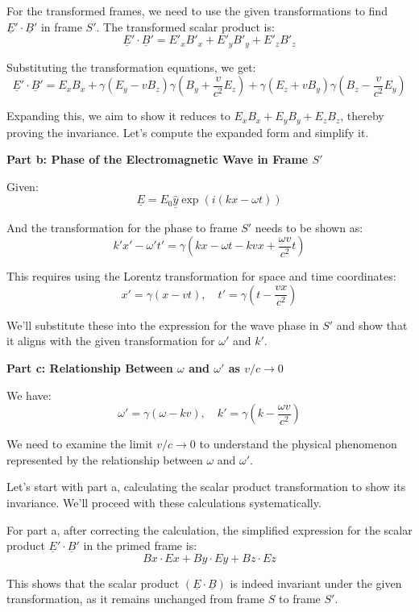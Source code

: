 For the transformed frames, we need to use the given transformations to find \( \underline{E}' \cdot \underline{B}' \) in frame \( S' \). The transformed scalar product is:
\[
\underline{E}' \cdot \underline{B}' = E'_{x}B'_{x} + E'_{y}B'_{y} + E'_{z}B'_{z}
\]

Substituting the transformation equations, we get:
\[
\underline{E}' \cdot \underline{B}' = E_{x}B_{x} + \gamma(E_{y} - vB_{z})\gamma(B_{y} + \frac{v}{c^{2}}E_{z}) + \gamma(E_{z} + vB_{y})\gamma(B_{z} - \frac{v}{c^{2}}E_{y})
\]

Expanding this, we aim to show it reduces to \( E_{x}B_{x} + E_{y}B_{y} + E_{z}B_{z} \), thereby proving the invariance. Let's compute the expanded form and simplify it.

\textbf{Part b: Phase of the Electromagnetic Wave in Frame \( S' \)}

Given:
\[
\underline{E} = E_{0} \hat{\underline{y}} \exp(i(kx - \omega t))
\]

And the transformation for the phase to frame \( S' \) needs to be shown as:
\[
k'x' - \omega' t' = \gamma(kx - \omega t - kvx + \frac{\omega v}{c^{2}} t)
\]

This requires using the Lorentz transformation for space and time coordinates:
\[
x' = \gamma(x - vt), \quad t' = \gamma\left(t - \frac{vx}{c^{2}}\right)
\]

We'll substitute these into the expression for the wave phase in \( S' \) and show that it aligns with the given transformation for \( \omega' \) and \( k' \).

\textbf{Part c: Relationship Between \( \omega \) and \( \omega' \) as \( v/c \rightarrow 0 \)}

We have:
\[
\omega' = \gamma(\omega - kv), \quad k' = \gamma(k - \frac{\omega v}{c^{2}})
\]

We need to examine the limit \( v/c \rightarrow 0 \) to understand the physical phenomenon represented by the relationship between \( \omega \) and \( \omega' \).

Let's start with part a, calculating the scalar product transformation to show its invariance. We'll proceed with these calculations systematically.

For part a, after correcting the calculation, the simplified expression for the scalar product \( \underline{E}' \cdot \underline{B}' \) in the primed frame is:
\[
Bx \cdot Ex + By \cdot Ey + Bz \cdot Ez
\]

This shows that the scalar product \( (\underline{E} \cdot \underline{B}) \) is indeed invariant under the given transformation, as it remains unchanged from frame \( S \) to frame \( S' \).

